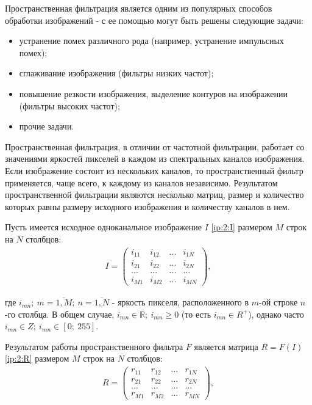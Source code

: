 

Пространственная фильтрация является одним из популярных способов обработки изображений - с ее помощью могут быть решены следующие задачи:

\begin{itemize}

	\item устранение помех различного рода (например, устранение импульсных помех);
	\item сглаживание изображения (фильтры низких частот);
	\item повышение резкости изображения, выделение контуров на изображении (фильтры высоких частот);
	\item прочие задачи.

\end{itemize}

Пространственная фильтрация, в отличии от частотной фильтрации, работает со значениями яркостей пикселей в каждом из спектральных каналов изображения. Если изображение состоит из нескольких каналов, то пространственный фильтр применяется, чаще всего, к каждому из каналов независимо. Результатом пространственной фильтрации являются несколько матриц, размер и количество которых равны размеру исходного изображения и количеству каналов в нем.

Пусть имеется исходное одноканальное изображение $I$ \eqref{ip:2:I} размером $M$ строк на $N$ столбцов:
\begin{gather}
	\label{ip:2:I}
	I = \left(
	\begin{array}{cccc}
		i_{11} & i_{12} & ... & i_{1N}\\
		i_{21} & i_{22} & ... & i_{2N}\\
		... & ... & ... & ...\\
		i_{M1} & i_{M2} & ... & i_{MN}
	\end{array}
	\right),
\end{gather}

где $i_{mn} ;~ m = \overline{1, M} ;~ n = \overline{1, N}$ - яркость пикселя, расположенного в $m$-ой строке $n$-го столбца. В общем случае, $i_{mn} \in \mathbb{R} ;~ i_{mn} \ge 0$ (то есть $i_{mn} \in R^+$), однако часто $i_{mn} \in Z ;~ i_{mn} \in [ 0 ;~ 255 ]$.

Результатом работы пространственного фильтра $F$ является матрица $R = F(I)$ \eqref{ip:2:R} размером $M$ строк на $N$ столбцов:
\begin{gather}
	\label{ip:2:R}
	R = \left(
	\begin{array}{cccc}
		r_{11} & r_{12} & ... & r_{1N}\\
		r_{21} & r_{22} & ... & r_{2N}\\
		... & ... & ... & ...\\
		r_{M1} & r_{M2} & ... & r_{MN}
	\end{array}
	\right),
\end{gather}

